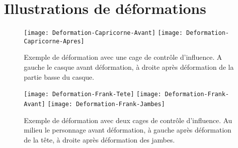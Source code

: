 
\chapter{Illustrations de déformations}

\graphicspath{{Appendix1/Appendix1Figs/PNG/}{Appendix1/Appendix1Figs/PDF/}{Appendix1/Appendix1Figs/}}

\begin{figure}[ht]
  \begin{center}
    \texttt{[image: Deformation-Capricorne-Avant]}
    \texttt{[image: Deformation-Capricorne-Apres]}

    \caption[Exemple de déformation cage de contrôle d'influence] {Exemple de
déformation avec une cage de contrôle d'influence. A gauche le casque avant
déformation, à droite après déformation de la partie basse du casque.}

  \end{center}
\end{figure}

\begin{figure}[ht]
  \begin{center}
    \texttt{[image: Deformation-Frank-Tete]}
    \texttt{[image: Deformation-Frank-Avant]}
    \texttt{[image: Deformation-Frank-Jambes]}

    \caption[Exemple de déformation multi-cage] {Exemple de déformation avec
deux cages de contrôle d'influence. Au milieu le personnage avant déformation,
à gauche après déformation de la tête, à droite après déformation des jambes.}

  \end{center}
\end{figure}

